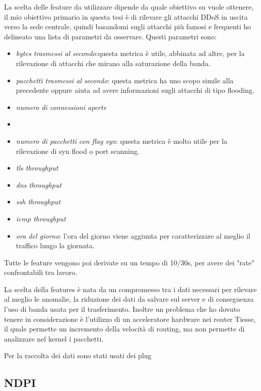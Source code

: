 La scelta delle feature da utilizzare dipende da quale obiettivo su vuole ottenere, il mio obiettivo primario in questa tesi è di rilevare gli attacchi DDoS in uscita verso la sede centrale, quindi basandomi sugli attacchi più famosi e frequenti ho delineato una lista di parametri da osservare. Questi parametri sono:
\begin{itemize}
    \item \emph{bytes trasmessi al secondo}:questa metrica è utile, abbinata ad altre, per la rilevazione di attacchi che mirano alla saturazione della banda.
    \item \emph{pacchetti trasmessi al secondo}: questa metrica ha uno scopo simile alla precedente oppure aiuta ad avere informazioni sugli attacchi di tipo flooding.
    \item \emph{numero di connessioni aperte} %
    \item 
    \item \emph{numero di pacchetti con flag syn}: questa metrica è molto utile per la rilevazione di syn flood o port scanning.
    \item \emph{tls throughput}
    \item \emph{dns throughput}
    \item \emph{ssh throughput}
    \item \emph{icmp throughput}
    \item \emph{ora del giorno}: l'ora del giorno viene aggiunta per caratterizzare al meglio il traffico lungo la giornata.
\end{itemize}

Tutte le feature vengono poi derivate su un tempo di 10/30s, per avere dei "rate" confrontabili tra lavoro.

La scelta della features è nata da un compromesso tra i dati necessari per rilevare al meglio le anomalie, la riduzione dei dati da salvare sul server e di conseguenza l'uso di banda usata per il trasferimento. Inoltre un problema che ho dovuto tenere in considerazione è l'utilizzo di un acceleratore hardware nei router Tiesse, il quale permette un incremento della velocità di routing, ma non permette di analizzare nel kernel i pacchetti.
 
 Per la raccolta dei dati sono stati usati dei plug
\subsection{NDPI}

